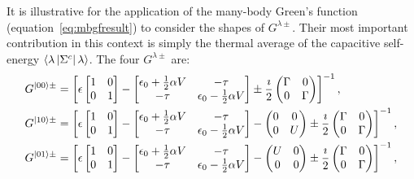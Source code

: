 It is illustrative for the application of the many-body Green's function (equation~\ref{eq:mbgfresult}) to consider the shapes of $G^{\lambda\pm}$. Their most important contribution in this context is simply the thermal average of the capacitive self-energy $\braket{\lambda\left|\Sigma^c\right|\lambda}$. The four $G^{\lambda\pm}$ are:
\begin{align*}
G^{\ket{00}\pm} &= \left[ \epsilon \begin{bmatrix} 1 & 0 \\ 0 & 1 \end{bmatrix} - \begin{bmatrix} \epsilon_0 + \frac{1}{2} \alpha V & -\tau \\
-\tau & \epsilon_0 - \frac{1}{2} \alpha V\end{bmatrix}  \pm \frac{\imath}{2} \begin{pmatrix} \Gamma & 0 \\ 0 & \Gamma \end{pmatrix} \right]^{-1}, \\
G^{\ket{10}\pm} &= \left[ \epsilon \begin{bmatrix} 1 & 0 \\ 0 & 1 \end{bmatrix} - \begin{bmatrix} \epsilon_0 + \frac{1}{2} \alpha V & -\tau \\
-\tau & \epsilon_0 - \frac{1}{2} \alpha V\end{bmatrix} - \begin{pmatrix} 0 & 0 \\ 0 & U \end{pmatrix} \pm \frac{\imath}{2} \begin{pmatrix} \Gamma & 0 \\ 0 & \Gamma \end{pmatrix} \right]^{-1}, \\
G^{\ket{01}\pm} &= \left[ \epsilon \begin{bmatrix} 1 & 0 \\ 0 & 1 \end{bmatrix} - \begin{bmatrix} \epsilon_0 + \frac{1}{2} \alpha V & -\tau \\
-\tau & \epsilon_0 - \frac{1}{2} \alpha V\end{bmatrix} - \begin{pmatrix} U & 0 \\ 0 & 0 \end{pmatrix} \pm \frac{\imath}{2} \begin{pmatrix} \Gamma & 0 \\ 0 & \Gamma \end{pmatrix} \right]^{-1},\\

\end{align*}
